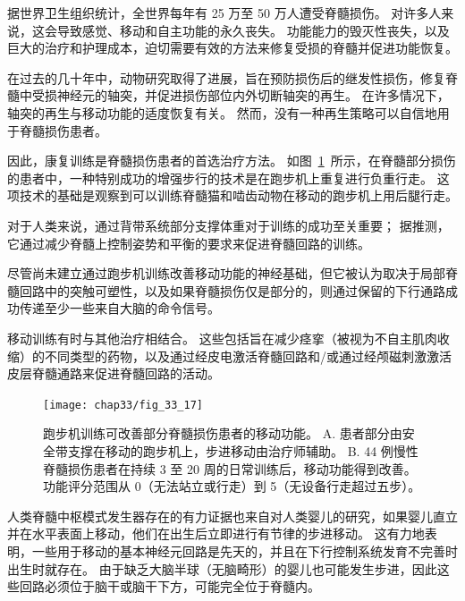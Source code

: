 \begin{proposition}[康复训练可改善人类脊髓损伤后的行走] \label{box:33_4}
	
	\quad \quad 据世界卫生组织统计，全世界每年有 25 万至 50 万人遭受脊髓损伤。
	对许多人来说，这会导致感觉、移动和自主功能的永久丧失。
	功能能力的毁灭性丧失，以及巨大的治疗和护理成本，迫切需要有效的方法来修复受损的脊髓并促进功能恢复。
	
	\quad \quad 在过去的几十年中，动物研究取得了进展，旨在预防损伤后的继发性损伤，修复脊髓中受损神经元的轴突，并促进损伤部位内外切断轴突的再生。
	在许多情况下，轴突的再生与移动功能的适度恢复有关。
	然而，没有一种再生策略可以自信地用于脊髓损伤患者。
	
	\quad \quad 因此，康复训练是脊髓损伤患者的首选治疗方法。
	如图~\ref{fig:33_17}~所示，在脊髓部分损伤的患者中，一种特别成功的增强步行的技术是在跑步机上重复进行负重行走。
	这项技术的基础是观察到可以训练脊髓猫和啮齿动物在移动的跑步机上用后腿行走。
	
	\quad \quad 对于人类来说，通过背带系统部分支撑体重对于训练的成功至关重要；
	据推测，它通过减少脊髓上控制姿势和平衡的要求来促进脊髓回路的训练。
	
	\quad \quad 尽管尚未建立通过跑步机训练改善移动功能的神经基础，但它被认为取决于局部脊髓回路中的突触可塑性，以及如果脊髓损伤仅是部分的，则通过保留的下行通路成功传递至少一些来自大脑的命令信号。
	
	\quad \quad 移动训练有时与其他治疗相结合。
	这些包括旨在减少痉挛（被视为不自主肌肉收缩）的不同类型的药物，以及通过经皮电激活脊髓回路和/或通过经颅磁刺激激活皮层脊髓通路来促进脊髓回路的活动。
	
\end{proposition}


\begin{figure}[htbp]
	\centering
	\texttt{[image: chap33/fig\_33\_17]}
	\caption{跑步机训练可改善部分脊髓损伤患者的移动功能。
		A. 患者部分由安全带支撑在移动的跑步机上，步进移动由治疗师辅助。
		B. 44 例慢性脊髓损伤患者在持续 3 至 20 周的日常训练后，移动功能得到改善。
		功能评分范围从 0（无法站立或行走）到 5（无设备行走超过五步）\cite{wernig1995laufband}。}
	\label{fig:33_17}
\end{figure}


人类脊髓中枢模式发生器存在的有力证据也来自对人类婴儿的研究，如果婴儿直立并在水平表面上移动，他们在出生后立即进行有节律的步进移动。
这有力地表明，一些用于移动的基本神经元回路是先天的，并且在下行控制系统发育不完善时出生时就存在。
由于缺乏大脑半球（无脑畸形）的婴儿也可能发生步进，因此这些回路必须位于脑干或脑干下方，可能完全位于脊髓内。



